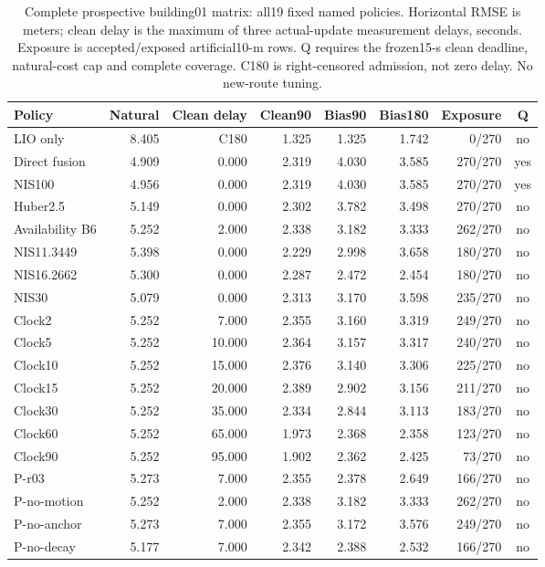 \begin{table}[t]\centering\small
\caption{Complete prospective building01 matrix: all19 fixed named policies. Horizontal RMSE is meters; clean delay is the maximum of three actual-update measurement delays, seconds. Exposure is accepted/exposed artificial10-m rows. Q requires the frozen15-s clean deadline, natural-cost cap and complete coverage. C180 is right-censored admission, not zero delay. No new-route tuning.}\label{tab:primary}
\begin{tabular}{lrrrrrrc}\toprule
Policy & Natural & Clean delay & Clean90 & Bias90 & Bias180 & Exposure & Q\\\midrule
LIO only & 8.405 & C180 & 1.325 & 1.325 & 1.742 & 0/270 & no \\
Direct fusion & 4.909 & 0.000 & 2.319 & 4.030 & 3.585 & 270/270 & yes \\
NIS100 & 4.956 & 0.000 & 2.319 & 4.030 & 3.585 & 270/270 & yes \\
Huber2.5 & 5.149 & 0.000 & 2.302 & 3.782 & 3.498 & 270/270 & no \\
Availability B6 & 5.252 & 2.000 & 2.338 & 3.182 & 3.333 & 262/270 & no \\
NIS11.3449 & 5.398 & 0.000 & 2.229 & 2.998 & 3.658 & 180/270 & no \\
NIS16.2662 & 5.300 & 0.000 & 2.287 & 2.472 & 2.454 & 180/270 & no \\
NIS30 & 5.079 & 0.000 & 2.313 & 3.170 & 3.598 & 235/270 & no \\
Clock2 & 5.252 & 7.000 & 2.355 & 3.160 & 3.319 & 249/270 & no \\
Clock5 & 5.252 & 10.000 & 2.364 & 3.157 & 3.317 & 240/270 & no \\
Clock10 & 5.252 & 15.000 & 2.376 & 3.140 & 3.306 & 225/270 & no \\
Clock15 & 5.252 & 20.000 & 2.389 & 2.902 & 3.156 & 211/270 & no \\
Clock30 & 5.252 & 35.000 & 2.334 & 2.844 & 3.113 & 183/270 & no \\
Clock60 & 5.252 & 65.000 & 1.973 & 2.368 & 2.358 & 123/270 & no \\
Clock90 & 5.252 & 95.000 & 1.902 & 2.362 & 2.425 & 73/270 & no \\
P-r03 & 5.273 & 7.000 & 2.355 & 2.378 & 2.649 & 166/270 & no \\
P-no-motion & 5.252 & 2.000 & 2.338 & 3.182 & 3.333 & 262/270 & no \\
P-no-anchor & 5.273 & 7.000 & 2.355 & 3.172 & 3.576 & 249/270 & no \\
P-no-decay & 5.177 & 7.000 & 2.342 & 2.388 & 2.532 & 166/270 & no \\
\bottomrule\end{tabular}\end{table}
